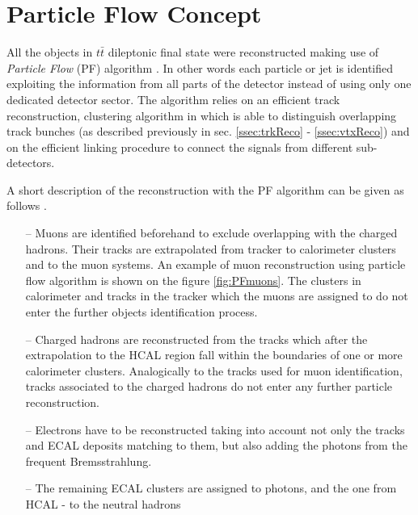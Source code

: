 \section{Particle Flow Concept}\label{sec:PF}

All the objects in $t\bar{t}$ dileptonic final state were reconstructed making use of \textit{Particle Flow} (PF)
algorithm \cite{Beaudette:2014cea}. In other words each particle or jet is identified exploiting the information from all parts
of the detector instead of using only one dedicated detector sector. The algorithm relies on an efficient track reconstruction,
clustering algorithm in which is able to distinguish overlapping track bunches (as described previously in sec. \ref{ssec:trkReco} - \ref{ssec:vtxReco})
and on the efficient linking procedure to connect the signals from different sub-detectors.

A short description of the reconstruction with the PF algorithm can be given as follows \cite{Beaudette:2014cea}.

\begin{itemize}
 \item [--] Muons are identified beforehand to exclude overlapping with the charged hadrons. Their tracks are extrapolated
 from tracker to calorimeter clusters and to the muon systems. An example of muon reconstruction using particle flow algorithm is 
 shown on the figure \ref{fig:PFmuons}. The clusters in calorimeter and tracks in the tracker which the muons are assigned to
 do not enter the further objects identification process.
 \item [--] Charged hadrons are reconstructed from the tracks which after the extrapolation to the HCAL region fall within the boundaries
 of one or more calorimeter clusters. Analogically to the tracks used for muon identification, tracks associated to the charged 
 hadrons do not enter any further particle reconstruction.
 \item [--] Electrons have to be reconstructed taking into account not only the tracks and ECAL deposits matching to them, but also
 adding the photons from the frequent Bremsstrahlung.
 \item [--] The remaining ECAL clusters are assigned to photons, and the one from HCAL - to the neutral hadrons
\end{itemize}

